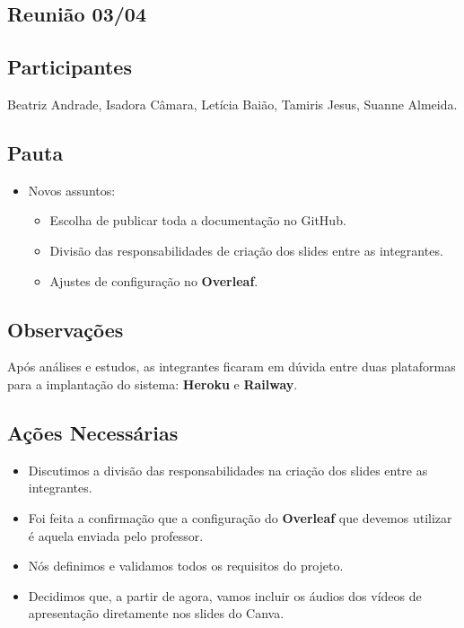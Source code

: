 \begin{apendicesenv}
\section*{Reunião 03/04}

\subsection*{Participantes}
Beatriz Andrade, Isadora Câmara, Letícia Baião, Tamiris Jesus, Suanne Almeida.

\subsection*{Pauta}
\begin{itemize}
    \item Novos assuntos:
    \begin{itemize}
        \item Escolha de publicar toda a documentação no GitHub.
        \item Divisão das responsabilidades de criação dos slides entre as integrantes.
        \item Ajustes de configuração no \textbf{Overleaf}.
    \end{itemize}
\end{itemize}

\subsection*{Observações}
Após análises e estudos, as integrantes ficaram em dúvida entre duas plataformas para a implantação do sistema: \textbf{Heroku} e \textbf{Railway}.

\subsection*{Ações Necessárias}
\begin{itemize}
    \item Discutimos a divisão das responsabilidades na criação dos slides entre as integrantes.
    \item Foi feita a confirmação que a configuração do \textbf{Overleaf} que devemos utilizar é aquela enviada pelo professor.
    \item Nós definimos e validamos todos os requisitos do projeto.
    \item Decidimos que, a partir de agora, vamos incluir os áudios dos vídeos de apresentação diretamente nos slides do Canva.
\end{itemize}


\end{apendicesenv}
